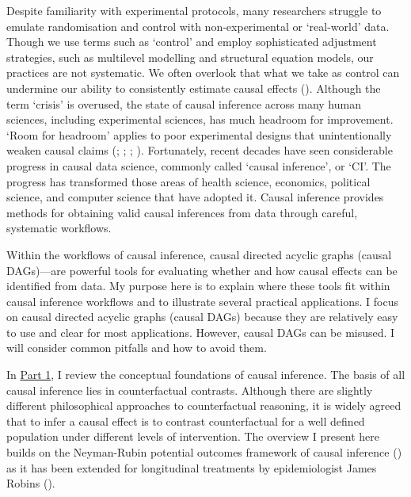 \documentclass[
  single column]{article}
\begin{document}
Despite familiarity with experimental protocols, many researchers
struggle to emulate randomisation and control with non-experimental or
`real-world' data. Though we use terms such as `control' and employ
sophisticated adjustment strategies, such as multilevel modelling and
structural equation models, our practices are not systematic. We often
overlook that what we take as control can undermine our ability to
consistently estimate causal effects
(). Although the
term `crisis' is overused, the state of causal inference across many
human sciences, including experimental sciences, has much headroom for
improvement. `Room for headroom' applies to poor experimental designs
that unintentionally weaken causal claims
(;
;
;
). Fortunately,
recent decades have seen considerable progress in causal data science,
commonly called `causal inference', or `CI'. The progress has
transformed those areas of health science, economics, political science,
and computer science that have adopted it. Causal inference provides
methods for obtaining valid causal inferences from data through careful,
systematic workflows.

Within the workflows of causal inference, causal directed acyclic graphs
(causal DAGs)---are powerful tools for evaluating whether and how causal
effects can be identified from data. My purpose here is to explain where
these tools fit within causal inference workflows and to illustrate
several practical applications. I focus on causal directed acyclic
graphs (causal DAGs) because they are relatively easy to use and clear
for most applications. However, causal DAGs can be misused. I will
consider common pitfalls and how to avoid them.

In \hyperref[id-sec-1]{Part 1}, I review the conceptual foundations of
causal inference. The basis of all causal inference lies in
counterfactual contrasts. Although there are slightly different
philosophical approaches to counterfactual reasoning, it is widely
agreed that to infer a causal effect is to contrast counterfactual for a
well defined population under different levels of intervention. The
overview I present here builds on the Neyman-Rubin potential outcomes
framework of causal inference () as it has been extended for longitudinal treatments by
epidemiologist James Robins ().
\end{document}
